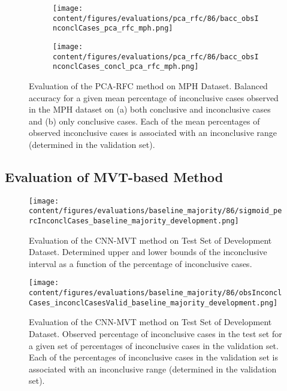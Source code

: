 \begin{figure}[t]
\begin{subfigure}{0.9\textwidth}
  \centering
  \texttt{[image: content/figures/evaluations/pca\_rfc/86/bacc\_obsInconclCases\_pca\_rfc\_mph.png]}
  \subcaption{}
  \label{fig:bacc_obsInconclCases_pca_rfc_mph}
\end{subfigure}
\hfill
\begin{subfigure}{0.9\textwidth}
  \centering
  \texttt{[image: content/figures/evaluations/pca\_rfc/86/bacc\_obsInconclCases\_concl\_pca\_rfc\_mph.png]}
  \subcaption{}
  \label{fig:bacc_obsInconclCases_concl_pca_rfc_mph}
\end{subfigure}

\caption{Evaluation of the PCA-RFC method on MPH Dataset.
Balanced accuracy for a given mean percentage of inconclusive cases observed in the MPH dataset on 
(a) both conclusive and inconclusive cases and (b) only conclusive cases. 
Each of the mean percentages of observed inconclusive cases is associated 
with an inconclusive range (determined in the validation set). }
\label{fig:bacc_obsInconclCases_pca_rfc_mph_full}
\end{figure}



\subsection{Evaluation of MVT-based Method}
\label{subsec:eval_mvt}





\begin{figure}[t]
  \centering
  \texttt{[image: content/figures/evaluations/baseline\_majority/86/sigmoid\_percInconclCases\_baseline\_majority\_development.png]}
  \caption{Evaluation of the CNN-MVT method on Test Set of Development Dataset. 
  Determined upper and lower bounds of the inconclusive interval as a function of the percentage of inconclusive cases.} 
  \label{fig:baseline_majority_percInconclCases_development}
\end{figure}


\begin{figure}[h]
  \centering
  \texttt{[image: content/figures/evaluations/baseline\_majority/86/obsInconclCases\_inconclCasesValid\_baseline\_majority\_development.png]}
  \caption{Evaluation of the CNN-MVT method on Test Set of Development Dataset.
  Observed percentage of inconclusive cases in the test set 
  for a given set of percentages of inconclusive cases in the validation set.
  Each of the percentages of inconclusive cases in the validation set is associated 
  with an inconclusive range (determined in the validation set).} 
  \label{fig:obsInconclCases_inconclCasesValid_baseline_majority_development}
\end{figure} 



